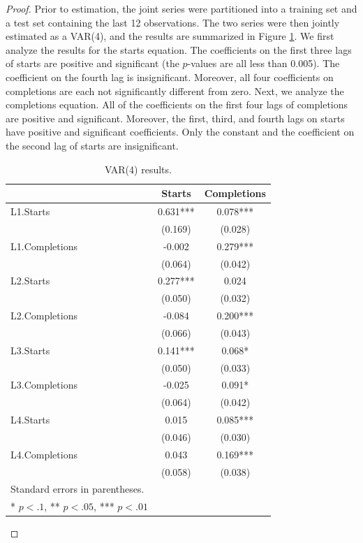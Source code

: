 \documentclass[oneside,reqno]{amsart}
\theoremstyle{definition}
\begin{document}
\begin{proof}
Prior to estimation, the joint series were partitioned into a training set and a test set containing the last 12 observations. The two series were then jointly estimated as a VAR(4), and the results are summarized in Figure \ref{var-summary}. We first analyze the results for the starts equation. The coefficients on the first three lags of starts are positive and significant (the $p$-values are all less than 0.005). The coefficient on the fourth lag is insignificant. Moreover, all four coefficients on completions are each not significantly different from zero. Next, we analyze the completions equation. All of the coefficients on the first four lags of completions are positive and significant. Moreover, the first, third, and fourth lags on starts have positive and significant coefficients. Only the constant and the coefficient on the second lag of starts are insignificant. 

\begin{table}
\caption{VAR(4) results.}
\begin{center}
\begin{tabular}{lcc}
\hline
          	        		& Starts & Completions  \\
\midrule
L1.Starts                    & 0.631*** & 0.078***  \\
                                  & (0.169)   & (0.028) \\
L1.Completions		& -0.002     & 0.279***  \\
            	       		& (0.064)   & (0.042) \\
L2.Starts    		& 0.277*** & 0.024 \\
          	       		& (0.050)   & (0.032) \\
L2.Completions    	& -0.084    & 0.200*** \\
          	       		& (0.066)   & (0.043) \\
L3.Starts			& 0.141*** & 0.068* \\
          	       		& (0.050)   & (0.033) \\
L3.Completions   	& -0.025    & 0.091* \\
          	       		& (0.064)   & (0.042) \\	       
L4.Starts			& 0.015     & 0.085*** \\
          	       		& (0.046)   & (0.030) \\
L4.Completions   	& 0.043     & 0.169*** \\
          	       		& (0.058)   & (0.038) \\	
\hline
Standard errors in parentheses. \\
* $p<.1$, ** $p<.05$, *** $p<.01$
\end{tabular}
\end{center}
\label{var-summary}
\end{table}
\end{proof}
\end{document}
